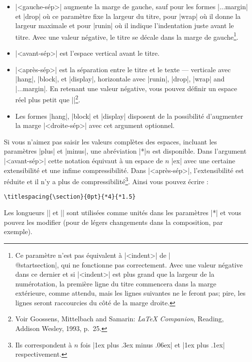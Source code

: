 \documentclass[a4paper]{ltxguide}
\def\gobble#1{}
\def\cs#1{\expandafter\gobble\string\\#1}
\begin{document}
\begin{itemize}
\item |<gauche-sép>| augmente la marge de gauche, sauf pour les formes |...margin| 
et |drop| où ce paramètre fixe la largeur du titre, pour |wrap| où il
donne la largeur maximale et pour |runin| où il indique l'indentation juste 
avant le titre. Avec une valeur négative, le titre se décale dans la marge de 
gauche\footnote{Ce paramètre n'est pas 
équivalent à |<indent>| de |\cs{@startsection}|, qui ne fonctionne pas 
correctement. Avec une valeur négative dans ce dernier et si |<indent>| est
plus grand que la largeur de la numérotation, la première ligne du titre 
commencera dans la marge extérieure, comme attendu, mais les lignes suivantes 
ne le feront pas; pire, les lignes seront raccourcies du côté de la marge 
droite.}.

\item |<avant-sép>| est l'espace vertical avant le titre.

\item |<après-sép>| est la séparation entre le titre et le texte --- verticale 
avec |hang|, |block|, et |display|, horizontale avec |runin|, |drop|, |wrap| 
and |...margin|. En retenant une valeur négative, vous pouvez définir un
espace réel plus petit que |\parskip|\footnote{Voir 
Goossens, Mittelbach and Samarin: \textit{\LaTeX{} Companion}, 
Reading, Addison Wesley, 1993, p.~25.}.

\item Les formes |hang|, |block| et |display| disposent de la possibilité 
d'augmenter la marge |<droite-sép>| avec cet argument optionnel.
\end{itemize}

Si vous n'aimez pas saisir les valeurs complètes des espaces, incluant les
paramètres |plus| et |minus|, une abréviation |*|$n$ est disponible. Dans 
l'argument |<avant-sép>| cette notation équivaut à un espace de $n$ |ex| 
avec une certaine extensibilité et une infime compressibilité. Dans  
|<après-sép>|, l'extensibilité est réduite et il n'y a plus de 
compressibilité\footnote{Ils correspondent à $n$ fois |1ex plus .3ex minus 
.06ex| et |1ex plus .1ex| respectivement.}. Ainsi vous pouvez écrire :
\begin{verbatim}
\titlespacing{\section}{0pt}{*4}{*1.5}
\end{verbatim}
Les longueurs |\beforetitleunit| et |\aftertitleunit| sont utilisées 
comme unités dans les paramètres |*| et vous pouvez les modifier (pour de 
légers changements dans la composition, par exemple).
\end{document}
